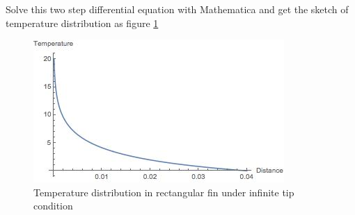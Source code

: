 \begin{solution}
\begin{enumerate}
Solve this two step differential equation with Mathematica and get the sketch of temperature distribution as figure \ref{fig:2:18}
\begin{figure}[h!]
  \centering
    \includegraphics[scale=1]{figures/ch2/18}
    \caption{Temperature distribution in rectangular fin under infinite tip condition}
    \label{fig:2:18}
\end{figure}
\end{enumerate}
\end{solution}













